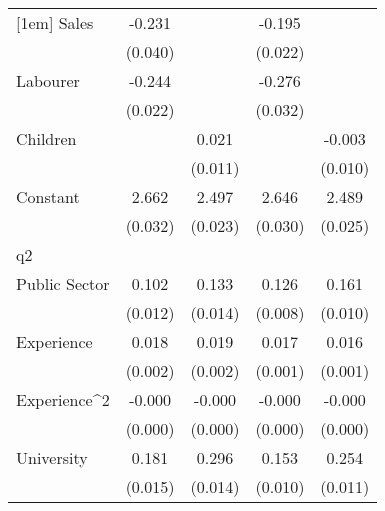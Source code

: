 {\begin{tabular}{l*{4}{c}}
[1em]
Sales               &      -0.231\sym{***}&                     &      -0.195\sym{***}&                     \\
                    &     (0.040)         &                     &     (0.022)         &                     \\
[1em]
Labourer            &      -0.244\sym{***}&                     &      -0.276\sym{***}&                     \\
                    &     (0.022)         &                     &     (0.032)         &                     \\
[1em]
Children            &                     &       0.021         &                     &      -0.003         \\
                    &                     &     (0.011)         &                     &     (0.010)         \\
[1em]
Constant            &       2.662\sym{***}&       2.497\sym{***}&       2.646\sym{***}&       2.489\sym{***}\\
                    &     (0.032)         &     (0.023)         &     (0.030)         &     (0.025)         \\
\hline
q2                  &                     &                     &                     &                     \\
Public Sector       &       0.102\sym{***}&       0.133\sym{***}&       0.126\sym{***}&       0.161\sym{***}\\
                    &     (0.012)         &     (0.014)         &     (0.008)         &     (0.010)         \\
[1em]
Experience          &       0.018\sym{***}&       0.019\sym{***}&       0.017\sym{***}&       0.016\sym{***}\\
                    &     (0.002)         &     (0.002)         &     (0.001)         &     (0.001)         \\
[1em]
Experience^{2}      &      -0.000\sym{***}&      -0.000\sym{***}&      -0.000\sym{***}&      -0.000\sym{***}\\
                    &     (0.000)         &     (0.000)         &     (0.000)         &     (0.000)         \\
[1em]
University          &       0.181\sym{***}&       0.296\sym{***}&       0.153\sym{***}&       0.254\sym{***}\\
                    &     (0.015)         &     (0.014)         &     (0.010)         &     (0.011)         \\

\end{tabular}}
